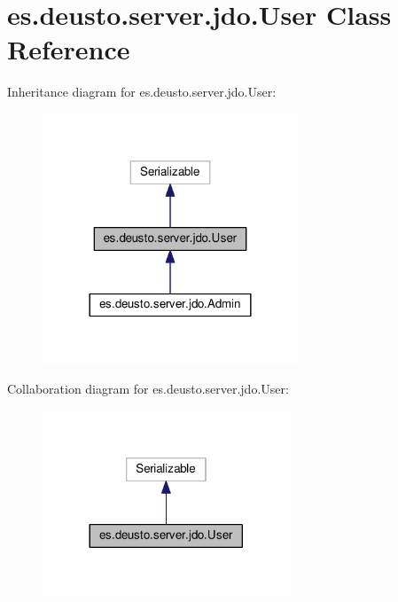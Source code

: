\hypertarget{classes_1_1deusto_1_1server_1_1jdo_1_1_user}{}\section{es.\+deusto.\+server.\+jdo.\+User Class Reference}
\label{classes_1_1deusto_1_1server_1_1jdo_1_1_user}


Inheritance diagram for es.\+deusto.\+server.\+jdo.\+User\+:\nopagebreak
\begin{figure}[H]
\begin{center}
\leavevmode
\includegraphics[width=216pt]{classes_1_1deusto_1_1server_1_1jdo_1_1_user__inherit__graph}
\end{center}
\end{figure}


Collaboration diagram for es.\+deusto.\+server.\+jdo.\+User\+:\nopagebreak
\begin{figure}[H]
\begin{center}
\leavevmode
\includegraphics[width=209pt]{classes_1_1deusto_1_1server_1_1jdo_1_1_user__coll__graph}
\end{center}
\end{figure}
